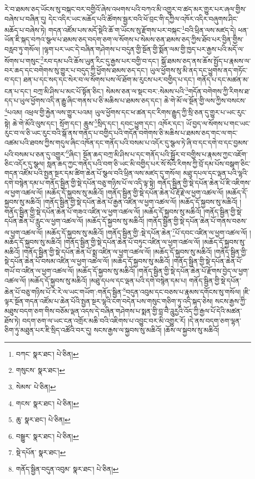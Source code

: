 རེ་བ་ཐམས་ཅད་ཡོངས་སུ་བསྐང་བར་བགྱིའོ་ཞེས་འཕགས་པའི་བཀའ་མི་འགྱུར་བ་ཚད་མར་གྱུར་པར་ཞལ་གྱིས་བཞེས་པ་བཞིན་དུ། དེང་འདིར་ཡང་མཆོད་པའི་ཚོགས་སྦྱར་བའི་ཕོ་བྲང་གི་དཀྱིལ་འཁོར་འདིར་བཞུགས་ཤིང་མཆོད་པ་བཞེས་ཏེ། གདན་འཛོམ་པས་མདོ་སྡེའི་ཆོ་ག་ཡོངས་སུ་རྫོགས་པར་བསྐང་\footnote{བཀང་  སྣར་ཐང་།  པེ་ཅིན། }བའི་ཕྲིན་ལས་མཛད་དེ། ཕན་ཡོན་ཇི་སྐད་བཀའ་སྩལ་པ་ཐམས་ཅད་བདག་ཅག་ལ་སོགས་པ་སེམས་ཅན་ཐམས་ཅད་ཀྱིས་ཐོབ་པར་བྱིན་གྱིས་བརླབ་ཏུ་གསོལ། །ལྷག་པར་ཡང་དེ་བཞིན་གཤེགས་པ་བདུན་གྱི་སྔོན་གྱི་སྨོན་ལམ་གྱི་ཁྱད་པར་རྒྱས་པའི་མདོ་ལ་སོགས་པ་གསུང་\footnote{གསུངས་  སྣར་ཐང་། }རབ་དམ་པའི་ཆོས་ཡུན་རིང་དུ་རྒྱས་པར་བགྱི་བ་དང་། སྒོ་ཐམས་ཅད་ནས་ཆོས་སྤྱོད་པ་རྣམས་ལ་བར་ཆད་དང་བགེགས་སུ་གྱུར་པ་བདུད་ཀྱི་ཕྱོགས་ཐམས་ཅད་དང་། ཡུལ་ཕྱོགས་སུ་མི་ནད་དང་ཕྱུགས་ནད་གཏོང་བ་དང་། ཐན་པ་དང་སད་དང་སེར་བ་ལ་སོགས་པས་ལོ་ཐོག་མ་རུངས་པར་བགྱིད་པ་དང་། གནོད་པ་དང་མཚན་མ་ངན་པ་དང་། བཀྲ་མི་ཤིས་པ་མང་པོ་སྟོན་ཅིང་། སེམས་ཅན་ལ་སྡང་བར་:སེམས་པའི་\footnote{སེམས་  པེ་ཅིན། }གདོན་བགེགས་ཀྱི་རིགས་ཐ་དད་པ་ཡུལ་ཕྱོགས་འདི་ན་རྒྱུ་ཞིང་གནས་པ་ཅི་མཆིས་པ་ཐམས་ཅད་དང་། ཆེ་གེ་མོ་ལ་སྔོན་གྱི་ལས་ཀྱིས་བསངས་\footnote{གངས་  སྣར་ཐང་།  པེ་ཅིན། }པའམ། འཕྲལ་གྱི་རྐྱེན་ལས་གྱུར་པའམ། ཡུལ་ཕྱོགས་དང་ཕ་ཚན་དང་རིགས་རྒྱུད་ཀྱི་སྲི་ཅན་དུ་གྱུར་པ་ཡང་རུང་སྟེ། ཆེ་གེ་མོའི་ལུས་དང་། སྲོག་དང་། ཆུས་\footnote{ཆུ་  སྣར་ཐང་།  པེ་ཅིན། }སྲིད་དང་། དབང་ཕྱུག་དང་། འཁོར་དང་། ཡོ་བྱད་ལ་སོགས་པ་གང་ཡང་རུང་བ་ལ་ཅི་ཡང་རུང་བའི་སྒོ་ནས་གནོད་པ་བགྱིད་པའི་གདོན་བགེགས་ཅི་མཆིས་པ་ཐམས་ཅད་གང་ལ་གང་འཚམ་པའི་ཐབས་ཀྱིས་གདུལ་ཞིང་འཁོན་དང་གནོད་པའི་བསམ་པ་འདོར་དུ་སྩལ་ཏེ་ཞི་བ་དང་དགེ་བ་དང་བྱམས་པའི་བསམ་པ་ཅན་དུ་འགྱུར་\footnote{བསྒྱུར་  སྣར་ཐང་།  པེ་ཅིན། }ཞིང་། སྔོན་ཆད་བཀྲ་མི་ཤིས་པ་དང་གནོད་པའི་སྦྱོར་བ་བགྱིས་པ་རྣམས་ཀྱང་འཇོག་ཅིང་འདོར་དུ་སྩལ། སླན་ཆད་ཀྱང་གནོད་པའི་བག་ཅི་ཡང་མི་བགྱིད་པར་སོ་སོའི་རིགས་ཀྱི་བྲོ་དམ་པོས་བསྒག་ཅིང་གདན་འཛོམ་པའི་སྤྱན་སྔར་དམ་ཚིག་ཆེན་པོ་སྩལ་བའི་ཕྲིན་ལས་མཛད་དུ་གསོལ། མཐུ་དཔལ་དང་ལྡན་པའི་ལྷའི་དགེ་བསྙེན་དམ་པ་གནོད་སྦྱིན་གྱི་སྡེ་དཔོན་བཅུ་གཉིས་པོ་ལ་འདི་ལྟ་སྟེ། གནོད་སྦྱིན་གྱི་སྡེ་དཔོན་ཆེན་པོ་ཇི་འཇིགས་ལ་ཕྱག་འཚལ་ལོ། །མཆོད་དོ་སྐྱབས་སུ་མཆིའོ། །གནོད་སྦྱིན་གྱི་སྡེ་དཔོན་ཆེན་པོ་རྡོ་རྗེ་ལ་ཕྱག་འཚལ་ལོ། །མཆོད་དོ་སྐྱབས་སུ་མཆིའོ། །གནོད་སྦྱིན་གྱི་སྡེ་དཔོན་ཆེན་པོ་རྒྱན་འཛིན་ལ་ཕྱག་འཚལ་ལོ། །མཆོད་དོ་སྐྱབས་སུ་མཆིའོ། །གནོད་སྦྱིན་གྱི་སྡེ་དཔོན་ཆེན་པོ་གཟའ་འཛིན་ལ་ཕྱག་འཚལ་ལོ། །མཆོད་དོ་སྐྱབས་སུ་མཆིའོ། །གནོད་སྦྱིན་གྱི་སྡེ་དཔོན་ཆེན་པོ་རླུང་ལ་ཕྱག་འཚལ་ལོ། །མཆོད་དོ་སྐྱབས་སུ་མཆིའོ། །གནོད་སྦྱིན་གྱི་སྡེ་དཔོན་ཆེན་པོ་གནས་བཅས་ལ་ཕྱག་འཚལ་ལོ། །མཆོད་དོ་སྐྱབས་སུ་མཆིའོ། །གནོད་སྦྱིན་གྱི་:སྡེ་དཔོན་ཆེན་\footnote{སྡེ་དཔོན་  སྣར་ཐང་། }པོ་དབང་འཛིན་ལ་ཕྱག་འཚལ་ལོ། །མཆོད་དོ་སྐྱབས་སུ་མཆིའོ། །གནོད་སྦྱིན་གྱི་སྡེ་དཔོན་ཆེན་པོ་བཏུང་འཛིན་ལ་ཕྱག་འཚལ་ལོ། །མཆོད་དོ་སྐྱབས་སུ་མཆིའོ། །གནོད་སྦྱིན་གྱི་སྡེ་དཔོན་ཆེན་པོ་སྨྲ་འཛིན་ལ་ཕྱག་འཚལ་ལོ། །མཆོད་དོ་སྐྱབས་སུ་མཆིའོ། །གནོད་སྦྱིན་གྱི་སྡེ་དཔོན་ཆེན་པོ་བསམ་འཛིན་ལ་ཕྱག་འཚལ་ལོ། །མཆོད་དོ་སྐྱབས་སུ་མཆིའོ། །གནོད་སྦྱིན་གྱི་སྡེ་དཔོན་ཆེན་པོ་གཡོ་བ་འཛིན་ལ་ཕྱག་འཚལ་ལོ། །མཆོད་དོ་སྐྱབས་སུ་མཆིའོ། །གནོད་སྦྱིན་གྱི་སྡེ་དཔོན་ཆེན་པོ་རྫོགས་བྱེད་ལ་ཕྱག་འཚལ་ལོ། །མཆོད་དོ་སྐྱབས་སུ་མཆིའོ། །མཐུ་དཔལ་དང་ལྡན་པའི་དགེ་བསྙེན་དམ་པ། གནོད་སྦྱིན་གྱི་སྡེ་དཔོན་ཆེན་པོ་བཅུ་གཉིས་པོ་རེ་རེ་ལ་ཡང་གཡོག་:གནོད་སྦྱིན་\footnote{གནོད་སྦྱིན་བདུན་འབུམ་  སྣར་ཐང་།  པེ་ཅིན། }བདུན་འབུམ་དང་བཅས་པ་རྣམས་དགོངས་སུ་གསོལ། །ཇི་ལྟར་སྔོན་གདན་འཛོམ་པ་ཆེན་པོའི་སྤྱན་སྔར་ལྷའི་ངག་བདེན་པས་གསུང་གཅིག་ཏུ་འདི་སྐད་ཅེས། སངས་རྒྱས་ཀྱི་མཐུས་བདག་ཅག་གིས་བཅོམ་ལྡན་འདས་དེ་བཞིན་གཤེགས་པ་སྨན་གྱི་བླ་བཻ་ཌཱུརྱའི་འོད་ཀྱི་རྒྱལ་པོ་དེའི་མཚན་ཐོས་ཏེ། བདག་ཅག་ལ་ཡང་ངན་འགྲོར་མཆི་བའི་འཇིགས་པ་འབྱུང་བར་མི་འགྱུར་རོ། །དེ་ནས་བདག་ཅག་ལྷན་ཅིག་ཏུ་མཐུན་པར་ཇི་སྲིད་འཚོའི་བར་དུ། སངས་རྒྱས་ལ་སྐྱབས་སུ་མཆིའོ། །ཆོས་ལ་སྐྱབས་སུ་མཆིའོ། 